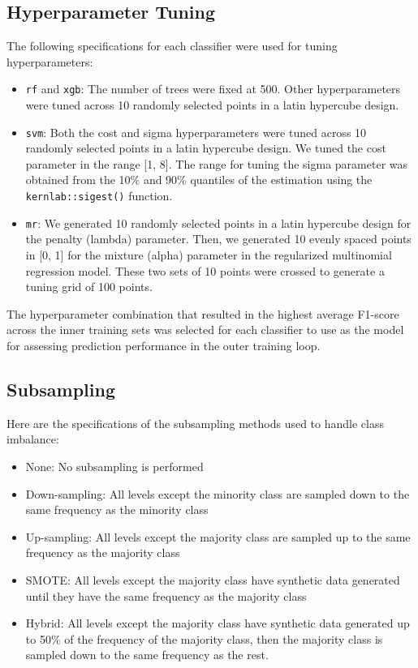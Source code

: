 \documentclass[
]{report}
\providecommand{\tightlist}{%
  \setlength{\itemsep}{0pt}\setlength{\parskip}{0pt}}
\begin{document}
\subsection{Hyperparameter Tuning}\label{hyperparameter-tuning}

The following specifications for each classifier were used for tuning hyperparameters:

\begin{itemize}
\tightlist
\item
  \texttt{rf} and \texttt{xgb}: The number of trees were fixed at 500. Other hyperparameters were tuned across 10 randomly selected points in a latin hypercube design.
\item
  \texttt{svm}: Both the cost and sigma hyperparameters were tuned across 10 randomly selected points in a latin hypercube design. We tuned the cost parameter in the range {[}1, 8{]}. The range for tuning the sigma parameter was obtained from the 10\% and 90\% quantiles of the estimation using the \texttt{kernlab::sigest()} function.
\item
  \texttt{mr}: We generated 10 randomly selected points in a latin hypercube design for the penalty (lambda) parameter. Then, we generated 10 evenly spaced points in {[}0, 1{]} for the mixture (alpha) parameter in the regularized multinomial regression model. These two sets of 10 points were crossed to generate a tuning grid of 100 points.
\end{itemize}

The hyperparameter combination that resulted in the highest average F1-score across the inner training sets was selected for each classifier to use as the model for assessing prediction performance in the outer training loop.

\subsection{Subsampling}\label{subsampling}

Here are the specifications of the subsampling methods used to handle class imbalance:

\begin{itemize}
\tightlist
\item
  None: No subsampling is performed
\item
  Down-sampling: All levels except the minority class are sampled down to the same frequency as the minority class
\item
  Up-sampling: All levels except the majority class are sampled up to the same frequency as the majority class
\item
  SMOTE: All levels except the majority class have synthetic data generated until they have the same frequency as the majority class
\item
  Hybrid: All levels except the majority class have synthetic data generated up to 50\% of the frequency of the majority class, then the majority class is sampled down to the same frequency as the rest.
\end{itemize}
\end{document}
